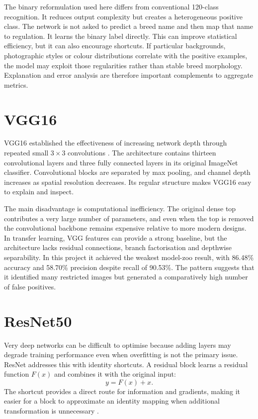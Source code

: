 The binary reformulation used here differs from conventional 120-class recognition. It reduces output complexity but creates a heterogeneous positive class. The network is not asked to predict a breed name and then map that name to regulation. It learns the binary label directly. This can improve statistical efficiency, but it can also encourage shortcuts. If particular backgrounds, photographic styles or colour distributions correlate with the positive examples, the model may exploit those regularities rather than stable breed morphology. Explanation and error analysis are therefore important complements to aggregate metrics.

\section{VGG16}
VGG16 established the effectiveness of increasing network depth through repeated small $3\times3$ convolutions \citep{simonyan2014very}. The architecture contains thirteen convolutional layers and three fully connected layers in its original ImageNet classifier. Convolutional blocks are separated by max pooling, and channel depth increases as spatial resolution decreases. Its regular structure makes VGG16 easy to explain and inspect.

The main disadvantage is computational inefficiency. The original dense top contributes a very large number of parameters, and even when the top is removed the convolutional backbone remains expensive relative to more modern designs. In transfer learning, VGG features can provide a strong baseline, but the architecture lacks residual connections, branch factorisation and depthwise separability. In this project it achieved the weakest model-zoo result, with 86.48\% accuracy and 58.70\% precision despite recall of 90.53\%. The pattern suggests that it identified many restricted images but generated a comparatively high number of false positives.

\section{ResNet50}
Very deep networks can be difficult to optimise because adding layers may degrade training performance even when overfitting is not the primary issue. ResNet addresses this with identity shortcuts. A residual block learns a residual function $F(x)$ and combines it with the original input:
\begin{equation}
y=F(x)+x.
\end{equation}
The shortcut provides a direct route for information and gradients, making it easier for a block to approximate an identity mapping when additional transformation is unnecessary \citep{he2016deep}.

